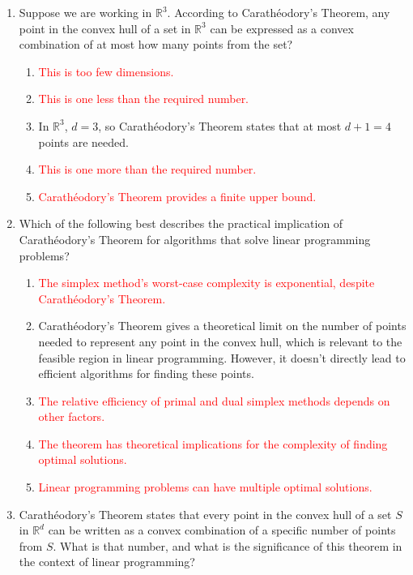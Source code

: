 \documentclass{article}%
\newcommand{\incorrect}[1]{\textcolor{red}{#1}}
\begin{document}
\begin{enumerate}
\begin{enumerate}
\end{enumerate}%
\vspace{1em}%
\item Suppose we are working in $\mathbb{R}^3$.  According to Carathéodory's Theorem, any point in the convex hull of a set in $\mathbb{R}^3$ can be expressed as a convex combination of at most how many points from the set?%
\begin{enumerate}%
\item \incorrect{This is too few dimensions.}%
\item \incorrect{This is one less than the required number.}%
\item In $\mathbb{R}^3$, $d=3$, so Carathéodory's Theorem states that at most $d+1 = 4$ points are needed.%
\item \incorrect{This is one more than the required number.}%
\item \incorrect{Carathéodory's Theorem provides a finite upper bound.}%
\end{enumerate}%
\vspace{1em}%
\item Which of the following best describes the practical implication of Carathéodory's Theorem for algorithms that solve linear programming problems?%
\begin{enumerate}%
\item \incorrect{The simplex method's worst-case complexity is exponential, despite Carathéodory's Theorem.}%
\item Carathéodory's Theorem gives a theoretical limit on the number of points needed to represent any point in the convex hull, which is relevant to the feasible region in linear programming. However, it doesn't directly lead to efficient algorithms for finding these points.%
\item \incorrect{The relative efficiency of primal and dual simplex methods depends on other factors.}%
\item \incorrect{The theorem has theoretical implications for the complexity of finding optimal solutions.}%
\item \incorrect{Linear programming problems can have multiple optimal solutions.}%
\end{enumerate}%
\vspace{1em}%
\item Carathéodory's Theorem states that every point in the convex hull of a set $S$ in $\mathbb{R}^d$ can be written as a convex combination of a specific number of points from $S$. What is that number, and what is the significance of this theorem in the context of linear programming?%

\end{enumerate}
\end{document}
